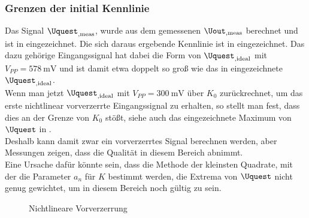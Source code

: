 \documentclass[../Report.tex]{subfiles}
\begin{document}
\subsubsection*{Grenzen der initial Kennlinie}
\label{subsubsec:opt.adjusta.problem}
Das Signal $\Uquest_{,\mathrm{meas}}$, wurde aus dem gemessenen $\Uout_{,\mathrm{meas}}$ berechnet und ist in  eingezeichnet. Die sich daraus ergebende Kennlinie ist in  eingezeichnet. Das dazu gehörige Eingangssignal hat dabei die Form von $\Uquest_{, \mathrm{ideal}}$ mit $V_{PP} = \SI{578}{\mV}$ und ist damit etwa doppelt so groß wie das in  eingezeichnete $\Uquest_{, \mathrm{ideal}}$.\\
Wenn man jetzt $\Uquest_{, \mathrm{ideal}}$ mit $V_{PP} = \SI{300}{\mV}$ über $K_0$ zurückrechnet, um das erste nichtlinear vorverzerrte Eingangssignal zu erhalten, so stellt man fest, dass dies an der Grenze von $K_0$ stößt, siehe auch das eingezeichnete Maximum von $\Uquest$ in . \\
Deshalb kann damit zwar ein vorverzerrtes Signal berechnen werden, aber Messungen zeigen, dass die Qualität in diesem Bereich abnimmt. \\
Eine Ursache dafür könnte sein, dass die Methode der kleinsten Quadrate, mit der die Parameter $a_n$ für $K$ bestimmt werden, die Extrema von $\Uquest$ nicht genug gewichtet, um in diesem Bereich noch gültig zu sein.
\begin{figure}[H]
\begin{subfigure}{0.5 \textwidth}
	\setlength\figureheight{7.5cm}
	\setlength\figurewidth{7.5cm}
    	
	\label{fig:K0}
\end{subfigure}
\begin{subfigure}{0.5 \textwidth}
	\setlength\figureheight{7.5cm}
	\setlength\figurewidth{7.5cm}
    
	\label{fig:UinUquest}
\end{subfigure}
\caption{Nichtlineare Vorverzerrung}
\label{fig:Amplitudenproblem}
\end{figure}
\end{document}
